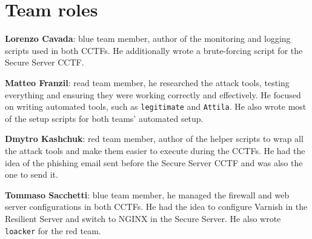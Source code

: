 \section{Team roles}
\label{sec:team-roles}

\noindent \textbf{Lorenzo Cavada}: blue team member, author of the monitoring and logging scripts used in both CCTFs. He additionally wrote a brute-forcing script for the Secure Server CCTF.

\medskip

\textbf{Matteo Franzil}: read team member, he researched the attack tools, testing everything and ensuring they were working correctly and effectively. He focused on writing automated tools, such as \texttt{legitimate} and \texttt{Attila}. He also wrote most of the setup scripts for both teams' automated setup.

\medskip

\noindent  \textbf{Dmytro Kashchuk}: red team member, author of the helper scripts to wrap all the attack tools and make them easier to execute during the CCTFs. He had the idea of the phishing email sent before the Secure Server CCTF and was also the one to send it.

\medskip

\noindent  \textbf{Tommaso Sacchetti}: blue team member, he managed the firewall and web server configurations in both CCTFs. He had the idea to configure Varnish in the Resilient Server and switch to NGINX in the Secure Server. He also wrote \texttt{loacker} for the red team.

\clearpage
\newpage